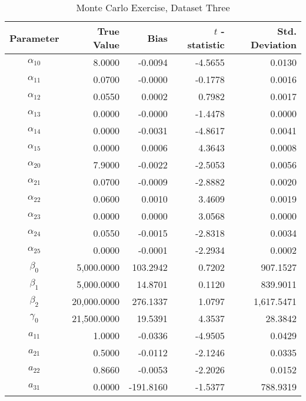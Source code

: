\begin{table}\onehalfspacing
\begin{center}
\begin{threeparttable}
  \caption{Monte Carlo Exercise, Dataset Three}
  \label{Monte Carlo: Three}
  \begin{tabular}{crrrr}\toprule

  Parameter & True Value & Bias & $t$ - statistic & Std. Deviation \\
  \midrule
  $\alpha_{10}$ &    \phantom{20000}8.0000 &   -0.0094 &  -4.5655 &    0.0130 \\
  $\alpha_{11}$ &      0.0700 &    -0.0000 &  -0.1778 &     0.0016\\
  $\alpha_{12}$ &      0.0550 &     0.0002 &   0.7982 &     0.0017\\
  $\alpha_{13}$ &      0.0000 &    -0.0000 &  -1.4478 &     0.0000\\
  $\alpha_{14}$ &      0.0000 &    -0.0031 &  -4.8617 &     0.0041\\
  $\alpha_{15}$ &      0.0000 &     0.0006 &   4.3643 &     0.0008\\
  $\alpha_{20}$ &      7.9000 &    -0.0022 &  -2.5053 &     0.0056\\
  $\alpha_{21}$ &      0.0700 &    -0.0009 &  -2.8882 &     0.0020\\
  $\alpha_{22}$ &      0.0600 &     0.0010 &   3.4609 &     0.0019\\
  $\alpha_{23}$ &      0.0000 &     0.0000 &   3.0568 &     0.0000\\
  $\alpha_{24}$ &      0.0550 &    -0.0015 &  -2.8318 &     0.0034\\
  $\alpha_{25}$ &      0.0000 &    -0.0001 &  -2.2934 &     0.0002\\
  $\beta_{0}$   &   5,000.0000 &  103.2942 &   0.7202 &   907.1527\\
  $\beta_{1}$   &   5,000.0000 &   14.8701 &   0.1120 &   839.9011\\
  $\beta_{2}$   &  20,000.0000 &  276.1337 &   1.0797 &  1,617.5471 \\
  $\gamma_{0}$  &  21,500.0000 &   19.5391 &   4.3537 &    28.3842\\
  $a_{11}$      &      1.0000 &    -0.0336 &  -4.9505 &     0.0429\\
  $a_{21}$      &      0.5000 &    -0.0112 &  -2.1246 &     0.0335\\
  $a_{22}$      &      0.8660 &    -0.0053 &  -2.2026 &     0.0152\\
  $a_{31}$      &      0.0000 &  -191.8160 &  -1.5377 &   788.9319\\

\end{tabular}
\end{threeparttable}
\end{center}
\end{table}

